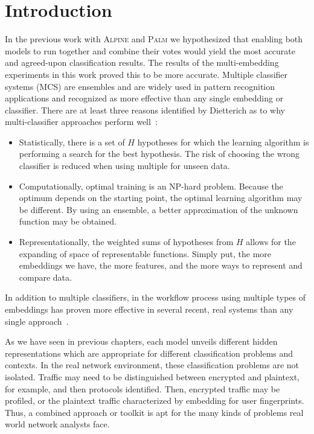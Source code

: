 \section{Introduction}

In the previous work with \textsc{Alpine} and \textsc{Palm} we hypothesized that enabling both models to run together and combine their votes would yield the most accurate and agreed-upon classification results. The results of the multi-embedding experiments in this work proved this to be more accurate. Multiple classifier systems (MCS) are ensembles and are widely used in pattern recognition applications and recognized as more effective than any single embedding or classifier. There are at least three reasons identified by Dietterich as to why multi-classifier approaches perform well~\cite{dietterich2000ensemble}:

\begin{itemize}
    \item Statistically, there is a set of $H$ hypotheses for which the learning algorithm is performing a search for the best hypothesis. The risk of choosing the wrong classifier is reduced when using multiple for unseen data.
    \item Computationally, optimal training is an NP-hard problem. Because the optimum depends on the starting point, the optimal learning algorithm may be different. By using an ensemble, a better approximation of the unknown function may be obtained.
    \item Representationally, the weighted sums of hypotheses from $H$ allows for the expanding of space of representable functions. Simply put, the more embeddings we have, the more features, and the more ways to represent and compare data.
\end{itemize}

In addition to multiple classifiers, in the workflow process using multiple types of embeddings has proven more effective in several recent, real systems than any single approach~\cite{tajaddodianfar2020texception, instruction2vec, duarte2019semi, yang2022, ayoade2020evolving, palau2020dns, kishioka2018, Boyaci2022, glass}.

As we have seen in previous chapters, each model unveils different hidden representations which are appropriate for different classification problems and contexts. In the real network environment, these classification problems are not isolated. Traffic may need to be distinguished between encrypted and plaintext, for example, and then protocols identified. Then, encrypted traffic may be profiled, or the plaintext traffic characterized by embedding for user fingerprints. Thus, a combined approach or toolkit is apt for the many kinds of problems real world network analysts face.

